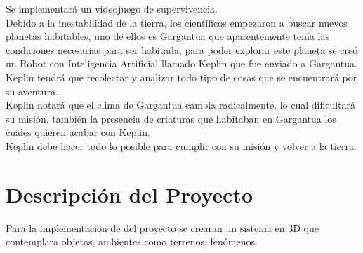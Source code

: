 \documentclass[a4paper]{article}
\begin{document}
Se implementará un videojuego de supervivencia.\\
Debido a la inestabilidad de la tierra, los científicos empezaron a buscar nuevos planetas habitables, uno de ellos es Gargantua que aparentemente tenía las condiciones necesarias para ser habitada, para poder explorar este planeta se creó un Robot con Inteligencia Artificial llamado Keplin que fue enviado a Gargantua. Keplin tendrá que recolectar y analizar todo tipo de cosas que se encuentrará por su aventura.\\
Keplin notará que el clima de Gargantua cambia radicalmente, lo cual dificultará su misión, también la presencia de criaturas que habitaban en Gargantua los cuales quieren acabar con Keplin.\\
Keplin debe hacer todo lo posible para cumplir con su misión y volver a la tierra.

\section{Descripción del Proyecto}

Para la implementación de del proyecto se crearan un sistema en 3D que 
contemplara objetos, ambientes como terrenos, fenómenos.\\
\end{document}
